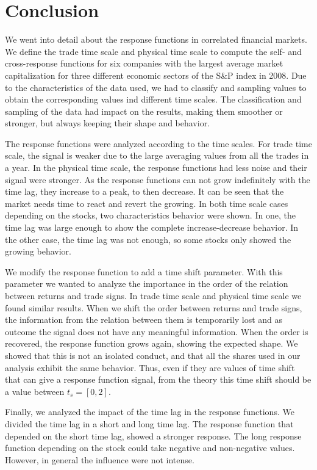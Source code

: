 \section{Conclusion}\label{sec:conclusion}

We went into detail about the response functions in correlated financial
markets. We define the trade time scale and physical time scale to compute the
self- and cross-response functions for six companies with the largest average
market capitalization for three different economic sectors of the S\&P index
in 2008.
Due to the characteristics of the data used, we had to classify and sampling
values to obtain the corresponding values ind different time scales.
The classification and sampling of the data had impact on the results, making
them smoother or stronger, but always keeping their shape and behavior.

The response functions were analyzed according to the time scales. For trade
time scale, the signal is weaker due to the large averaging values from all the
trades in a year. In the physical time scale, the response functions had less
noise and their signal were stronger. As the response functions can not grow
indefinitely with the time lag, they increase to a peak, to then decrease. It
can be seen that the market needs time to react and revert the growing.
In both time scale cases depending on the stocks, two characteristics behavior
were shown. In one, the time lag was large enough to show the complete
increase-decrease behavior. In the other case, the time lag was not enough, so
some stocks only showed the growing behavior.

We modify the response function to add a time shift parameter. With this
parameter we wanted to analyze the importance in the order of the relation
between returns and trade signs. In trade time scale and physical time scale we
found similar results. When we shift the order between returns and trade signs,
the information from the relation between them is temporarily lost and as
outcome the signal does not have any meaningful information. When the order is
recovered, the response function grows again, showing the expected shape.
We showed that this is not an isolated conduct, and that all the shares used in
our analysis exhibit the same behavior. Thus, even if they are values of time
shift that can give a response function signal, from the theory this time shift
should be a value between $t_{s} = [0,2]$.

Finally, we analyzed the impact of the time lag in the response functions. We
divided the time lag in a short and long time lag. The response function that
depended on the short time lag, showed a stronger response. The long response
function depending on the stock could take negative and non-negative values.
However, in general the influence were not intense.